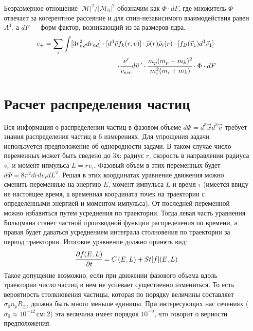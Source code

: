 

Безразмерное отношение $\left| \mathcal{M} \right|^{2}/
\left| \mathcal{M}_0 \right|^{2}$ обозначим как $\Phi \cdot dF$, где множитель $\Phi$ отвечает за когерентное рассеяние и для спин-независимого взаимодействия равен $A^4$, а $dF$ --- форм фактор, возникающий из-за размеров ядра.
\begin{equation}
\begin{split}
	\label{capture_nd}
	c_+ = \sum_i \int [3r_{nd}^2d r_{nd}]
	\cdot[d^3\vec{v} f_k(r,v)] \cdot 
	\widehat{\rho}(r) \widetilde{\rho}_i(r) 
	\cdot[f_{B}(\vec{v}_1) d^3\vec{v}_1] \cdot\\ 
	\cdot\cfrac{\nu'}{v_{esc}} d\vec{n}\,' \cdot
	\cfrac{m_{p} (m_p+m_k)^2}{m_i^2 ( m_i + m_k)}
	\cdot \Phi \cdot dF
\end{split}
\end{equation}

\section{Расчет распределения частиц}

Вся информация о распределении частиц в фазовом объеме $d\Phi = d^{3}\vec{x}d^{3}\vec{v}$
требует знания распределения частиц в 6 измерениях. Для упрощения задачи используется
предположение об однородности задачи. В таком случае число переменных может быть сведено 
до 3х: радиус $r$, скорость в направлении радиуса $v_r$ и момент ипмульса $L = r v_{\tau}$.
Фазовый объем в этих переменных будет $d\Phi = 8\pi^{2}drdv_{r}dL^{2}$. Решая в этих
координатах уравнение движения можно сменить переменные на энергию $E$, момент 
импульса $L$ и время $\tau$ (имеется ввиду не настоящее время, а временная координата точек на траектории с определенными энергией и моментом импульса). От последней переменной можно
избавиться путем усреднения по траектории. Тогда левая часть уравнения Больцмана станет
частной производной функции распределения по времени, а правая будет даваться усреднением интеграла столновения по траектории за период траектории. Итоговое уравнение должно принять вид:
\begin{equation}
	\label{eq:boltsman_EL}
	\cfrac{\partial f(E,L)}{\partial t} = C\left( {E,L} \right) + St\lbrack f\rbrack(E,L)
\end{equation}
Такое допущение возможно, если при движении фазового объема вдоль траектории число 
частиц в нем не успевает существенно измениться. То есть вероятность столкновения частицы,
которая по порядку величины составляет $\sigma_0 n_p R_{\odot}$, должна быть много меньше единицы. При интересующих нас сечениях ($\sigma_0 \approx 10^{-42} \,\text{см}:2$) эта величина 
имеет порядок $10^{-9}$, что говорит о верности предположения.

